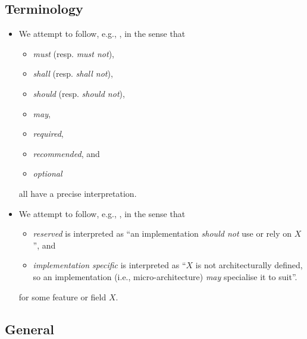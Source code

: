 
\subsection{Terminology}

\begin{itemize}

\item We attempt to follow, 
      e.g., \cite{SCARV:RFC:2119}, 
      in the sense that

      \begin{itemize}
      \item {\em        must} (resp. {\em must   not}),
      \item {\em       shall} (resp. {\em shall  not}),
      \item {\em      should} (resp. {\em should not}),
      \item {\em         may},
      \item {\em    required}, 
      \item {\em recommended}, 
            and 
      \item {\em    optional}
      \end{itemize}
      
      \noindent
      all have a precise interpretation.  

\item We attempt to follow, 
      e.g., \cite{SCARV:ARMglossary:20},
      in the sense that

      \begin{itemize}
      \item {\em                reserved}
            is interpreted as
            ``an implementation {\em should not} use or rely on $X$'',
            and
      \item {\em implementation specific}
            is interpreted as
            ``$X$ is not architecturally defined, so an implementation (i.e., micro-architecture) {\em may} specialise it to suit''.
      \end{itemize}

      \noindent
      for some feature or field $X$.

\end{itemize}


\subsection{General}

